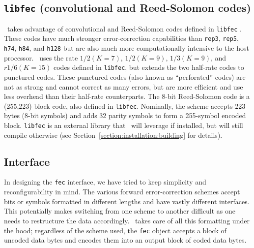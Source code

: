 \subsection{{\tt libfec} (convolutional and  Reed-Solomon codes)}
\label{module:fec:libfecv}
\liquid\ takes advantage of convolutional and Reed-Solomon codes defined in
{\tt libfec} \cite{libfec:web}.
These codes have much stronger error-correction capabilities than {\tt rep3},
{\tt rep5}, {\tt h74}, {\tt h84}, and {\tt h128}
but are also much more computationally intensive to the host processor.
\liquid\ uses the rate $1/2 (K=7)$, $1/2 (K=9)$, $1/3 (K=9)$, and
$r1/6 (K=15)$ codes defined in {\tt libfec}, but extends the two half-rate
codes to punctured codes.
These punctured codes (also known as ``perforated'' codes) are not as strong
and cannot correct as many errors, but are more efficient and use less
overhead than their half-rate counterparts.
%
The 8-bit Reed-Solomon code is a (255,223) block code, also defined in
{\tt libfec}.
Nominally, the scheme accepts 223 bytes (8-bit symbols) and adds 32 parity
symbols to form a 255-symbol encoded block.
%
{\tt libfec} is an external library that \liquid\ will leverage if
installed, but will still compile otherwise
(see Section~\ref{section:installation:building} for details).

\subsection{Interface}
\label{module:fec:interface}
In designing the {\tt fec} interface, we have tried to keep simplicity and
reconfigurability in mind.
The various forward error-correction schemes accept bits or symbols
formatted in different lengths and have vastly different interfaces.
This potentially makes switching from one scheme to another difficult as one
needs to restructure the data accordingly.
\liquid\ takes care of all this formatting under the hood; regardless of the
scheme used, the {\tt fec} object accepts a block of uncoded data bytes and
encodes them into an output block of coded data bytes.


